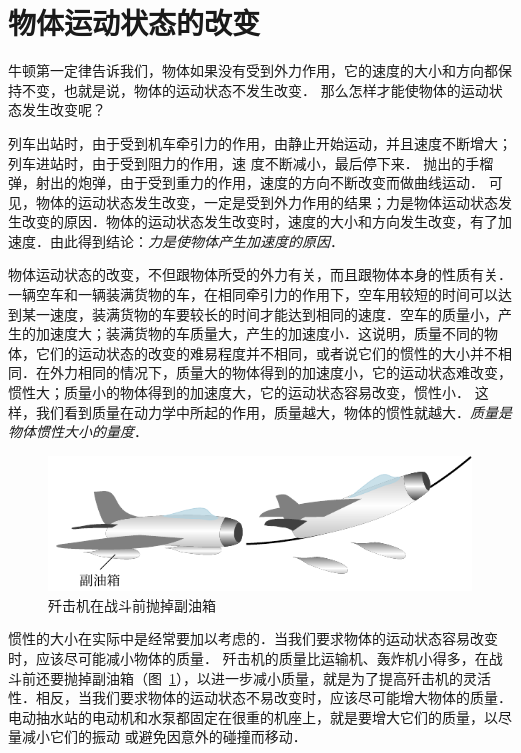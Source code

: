 \section{物体运动状态的改变}
牛顿第一定律告诉我们，物体如果没有受到外力作用，它的速度的大小和方向都保持不变，也就是说，物体的运动状态不发生改变．
那么怎样才能使物体的运动状态发生改变呢？

列车出站时，由于受到机车牵引力的作用，由静止开始运动，并且速度不断增大；列车进站时，由于受到阻力的作用，速
度不断减小，最后停下来．
抛出的手榴弹，射出的炮弹，由于受到重力的作用，速度的方向不断改变而做曲线运动．
可见，物体的运动状态发生改变，一定是受到外力作用的结果；力是物体运动状态发生改变的原因．物体的运动状态发生改变时，速度的大小和方向发生改变，有了加速度．由此得到结论：\textit{力是使物体产生加速度的原因}．

物体运动状态的改变，不但跟物体所受的外力有关，而且跟物体本身的性质有关．
一辆空车和一辆装满货物的车，在相同牵引力的作用下，空车用较短的时间可以达到某一速度，装满货物的车要较长的时间才能达到相同的速度．空车的质量小，产生的加速度大；装满货物的车质量大，产生的加速度小．这说明，质量不同的物体，它们的运动状态的改变的难易程度并不相同，或者说它们的惯性的大小并不相同．在外力相同的情况下，质量大的物体得到的加速度小，它的运动状态难改变，惯性大；质量小的物体得到的加速度大，它的运动状态容易改变，惯性小．
这样，我们看到质量在动力学中所起的作用，质量越大，物体的惯性就越大．\textit{质量是物体惯性大小的量度}．

\begin{figure}[htp]
    \centering
    \includegraphics{fig/A/3-2.pdf}
    \caption{歼击机在战斗前抛掉副油箱}\label{fig_A_3-2}
\end{figure}

惯性的大小在实际中是经常要加以考虑的．当我们要求物体的运动状态容易改变时，应该尽可能减小物体的质量．
歼击机的质量比运输机、轰炸机小得多，在战斗前还要抛掉副油箱（图~\ref{fig_A_3-2}），以进一步减小质量，就是为了提高歼击机的灵活性．相反，当我们要求物体的运动状态不易改变时，应该尽可能增大物体的质量．
电动抽水站的电动机和水泵都固定在很重的机座上，就是要增大它们的质量，以尽量减小它们的振动
或避免因意外的碰撞而移动．

